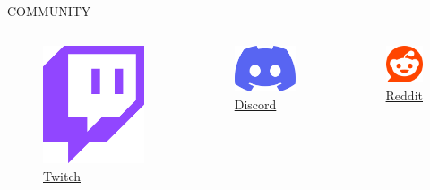 \documentclass[aspectratio=1610]{beamer}
\begin{document}
\begin{frame}{COMMUNITY}
    \begin{columns}
        \begin{figure}
            \includegraphics[width=0.5\linewidth, height=0.5\linewidth]{img/twitch.png}
            \caption{\href{https://www.twitch.tv/}{Twitch}}
        \end{figure}
        \begin{figure}
            \includegraphics[width=0.6\linewidth, height=0.5\linewidth]{img/discord.png}
            \caption{\href{https://discord.com/}{Discord}}    
        \end{figure}
        \begin{figure}
            \includegraphics[width=0.5\linewidth, height=0.5\linewidth]{img/reddit.png}
            \caption{\href{https://www.reddit.com/}{Reddit}}    
        \end{figure}
    \end{columns}
\end{frame}
\end{document}
